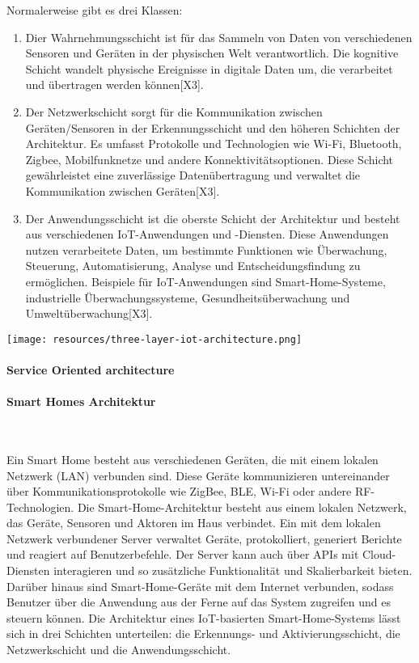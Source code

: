 Normalerweise gibt es drei Klassen:
\begin{enumerate}
    \item Dier Wahrnehmungsschicht ist für das Sammeln von Daten von verschiedenen Sensoren und Geräten in der physischen Welt verantwortlich. Die kognitive Schicht wandelt physische Ereignisse in digitale Daten um, die verarbeitet und übertragen werden können[X3]. 

\item Der Netzwerkschicht sorgt für die Kommunikation zwischen Geräten/Sensoren in der Erkennungsschicht und den höheren Schichten der Architektur. Es umfasst Protokolle und Technologien wie Wi-Fi, Bluetooth, Zigbee, Mobilfunknetze und andere Konnektivitätsoptionen. Diese Schicht gewährleistet eine zuverlässige Datenübertragung und verwaltet die Kommunikation zwischen Geräten[X3].

\item Der Anwendungsschicht ist die oberste Schicht der Architektur und besteht aus verschiedenen IoT-Anwendungen und -Diensten. Diese Anwendungen nutzen verarbeitete Daten, um bestimmte Funktionen wie Überwachung, Steuerung, Automatisierung, Analyse und Entscheidungsfindung zu ermöglichen. Beispiele für IoT-Anwendungen sind Smart-Home-Systeme, industrielle Überwachungssysteme, Gesundheitsüberwachung und Umweltüberwachung[X3].
\end{enumerate}
\texttt{[image: resources/three-layer-iot-architecture.png]}
\paragraph{Service Oriented architecture}

\paragraph{Smart Homes Architektur}\

Ein Smart Home besteht aus verschiedenen Geräten, die mit einem lokalen Netzwerk (LAN) verbunden sind. Diese Geräte kommunizieren untereinander über Kommunikationsprotokolle wie ZigBee, BLE, Wi-Fi oder andere RF-Technologien. Die Smart-Home-Architektur besteht aus einem lokalen Netzwerk, das Geräte, Sensoren und Aktoren im Haus verbindet. Ein mit dem lokalen Netzwerk verbundener Server verwaltet Geräte, protokolliert, generiert Berichte und reagiert auf Benutzerbefehle. Der Server kann auch über APIs mit Cloud-Diensten interagieren und so zusätzliche Funktionalität und Skalierbarkeit bieten. Darüber hinaus sind Smart-Home-Geräte mit dem Internet verbunden, sodass Benutzer über die Anwendung aus der Ferne auf das System zugreifen und es steuern können. Die Architektur eines IoT-basierten Smart-Home-Systems lässt sich in drei Schichten unterteilen: die Erkennungs- und Aktivierungsschicht, die Netzwerkschicht und die Anwendungsschicht.

